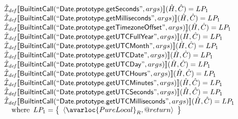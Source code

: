 \[\begin{array}{l}
\aI_{\it def}\lbr \SF{BuiltintCall}(``\SF{Date.prototype.getSeconds}",args)\rbr(\hat{H},\hat{C}) = LP_1\\
\aI_{\it def}\lbr \SF{BuiltintCall}(``\SF{Date.prototype.getMilliseconds}",args)\rbr(\hat{H},\hat{C}) = LP_1\\
\aI_{\it def}\lbr \SF{BuiltintCall}(``\SF{Date.prototype.getTimezoneOffset}",args)\rbr(\hat{H},\hat{C}) = LP_1\\
\aI_{\it def}\lbr \SF{BuiltintCall}(``\SF{Date.prototype.getUTCFullYear}",args)\rbr(\hat{H},\hat{C}) = LP_1\\
\aI_{\it def}\lbr \SF{BuiltintCall}(``\SF{Date.prototype.getUTCMonth}",args)\rbr(\hat{H},\hat{C}) = LP_1\\
\aI_{\it def}\lbr \SF{BuiltintCall}(``\SF{Date.prototype.getUTCDate}",args)\rbr(\hat{H},\hat{C}) = LP_1\\
\aI_{\it def}\lbr \SF{BuiltintCall}(``\SF{Date.prototype.getUTCDay}",args)\rbr(\hat{H},\hat{C}) = LP_1\\
\aI_{\it def}\lbr \SF{BuiltintCall}(``\SF{Date.prototype.getUTCHours}",args)\rbr(\hat{H},\hat{C}) = LP_1\\
\aI_{\it def}\lbr \SF{BuiltintCall}(``\SF{Date.prototype.getUTCMinutes}",args)\rbr(\hat{H},\hat{C}) = LP_1\\
\aI_{\it def}\lbr \SF{BuiltintCall}(``\SF{Date.prototype.getUTCSeconds}",args)\rbr(\hat{H},\hat{C}) = LP_1\\
\aI_{\it def}\lbr \SF{BuiltintCall}(``\SF{Date.prototype.getUTCMilliseconds}",args)\rbr(\hat{H},\hat{C}) = LP_1\\
\quad\wherec{
  LP_1 = \set{\langle\avarloc{PureLocal}_R,\varprop{return}\rangle}\\
  }\\
\\

\end{array}
\]
